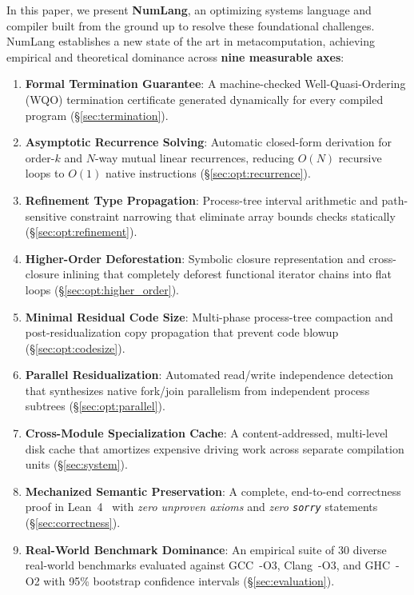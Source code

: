 In this paper, we present \textbf{NumLang}, an optimizing systems language and compiler built from the ground up to resolve these foundational challenges. NumLang establishes a new state of the art in metacomputation, achieving empirical and theoretical dominance across \textbf{nine measurable axes}:
\begin{enumerate}
    \item \textbf{Formal Termination Guarantee}: A machine-checked Well-Quasi-Ordering (WQO) termination certificate generated dynamically for every compiled program (\S\ref{sec:termination}).
    \item \textbf{Asymptotic Recurrence Solving}: Automatic closed-form derivation for order-$k$ and $N$-way mutual linear recurrences, reducing $O(N)$ recursive loops to $O(1)$ native instructions (\S\ref{sec:opt:recurrence}).
    \item \textbf{Refinement Type Propagation}: Process-tree interval arithmetic and path-sensitive constraint narrowing that eliminate array bounds checks statically (\S\ref{sec:opt:refinement}).
    \item \textbf{Higher-Order Deforestation}: Symbolic closure representation and cross-closure inlining that completely deforest functional iterator chains into flat loops (\S\ref{sec:opt:higher_order}).
    \item \textbf{Minimal Residual Code Size}: Multi-phase process-tree compaction and post-residualization copy propagation that prevent code blowup (\S\ref{sec:opt:codesize}).
    \item \textbf{Parallel Residualization}: Automated read/write independence detection that synthesizes native fork/join parallelism from independent process subtrees (\S\ref{sec:opt:parallel}).
    \item \textbf{Cross-Module Specialization Cache}: A content-addressed, multi-level disk cache that amortizes expensive driving work across separate compilation units (\S\ref{sec:system}).
    \item \textbf{Mechanized Semantic Preservation}: A complete, end-to-end correctness proof in Lean~4~\cite{demoura2021lean} with \textit{zero unproven axioms} and \textit{zero \texttt{sorry}} statements (\S\ref{sec:correctness}).
    \item \textbf{Real-World Benchmark Dominance}: An empirical suite of 30 diverse real-world benchmarks evaluated against GCC~-O3, Clang~-O3, and GHC~-O2 with 95\% bootstrap confidence intervals (\S\ref{sec:evaluation}).
\end{enumerate}

